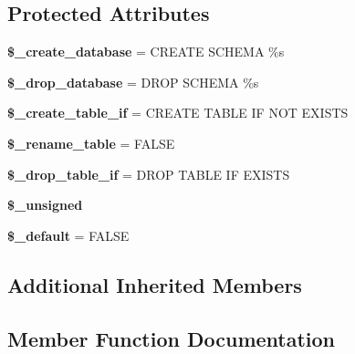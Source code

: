 \subsection*{Protected Attributes}
\begin{DoxyCompactItemize}
\item 
\mbox{\label{class_c_i___d_b__pdo__4d__forge_a51340c2d8ab478b3d57532dd5da28001}} 
{\bfseries \$\+\_\+create\+\_\+database} = \textquotesingle{}C\+R\+E\+A\+TE S\+C\+H\+E\+MA \%s\textquotesingle{}
\item 
\mbox{\label{class_c_i___d_b__pdo__4d__forge_a830160ddab2aeb8f038a3daca949c15e}} 
{\bfseries \$\+\_\+drop\+\_\+database} = \textquotesingle{}D\+R\+OP S\+C\+H\+E\+MA \%s\textquotesingle{}
\item 
\mbox{\label{class_c_i___d_b__pdo__4d__forge_aeb589b4fba56816696ffc357d0d8924a}} 
{\bfseries \$\+\_\+create\+\_\+table\+\_\+if} = \textquotesingle{}C\+R\+E\+A\+TE T\+A\+B\+LE IF N\+OT E\+X\+I\+S\+TS\textquotesingle{}
\item 
\mbox{\label{class_c_i___d_b__pdo__4d__forge_a4a6c230fc1251928f981fad6b6821f23}} 
{\bfseries \$\+\_\+rename\+\_\+table} = F\+A\+L\+SE
\item 
\mbox{\label{class_c_i___d_b__pdo__4d__forge_a651f4dcd3b134c91511f335d51e3ae9c}} 
{\bfseries \$\+\_\+drop\+\_\+table\+\_\+if} = \textquotesingle{}D\+R\+OP T\+A\+B\+LE IF E\+X\+I\+S\+TS\textquotesingle{}
\item 
{\bfseries \$\+\_\+unsigned}
\item 
\mbox{\label{class_c_i___d_b__pdo__4d__forge_a174c786df18e548beccb84f907a59eec}} 
{\bfseries \$\+\_\+default} = F\+A\+L\+SE
\end{DoxyCompactItemize}
\subsection*{Additional Inherited Members}


\subsection{Member Function Documentation}
\mbox{\label{class_c_i___d_b__pdo__4d__forge_ad22823508d8d530c384ed9e5dc3dfddd}} 
